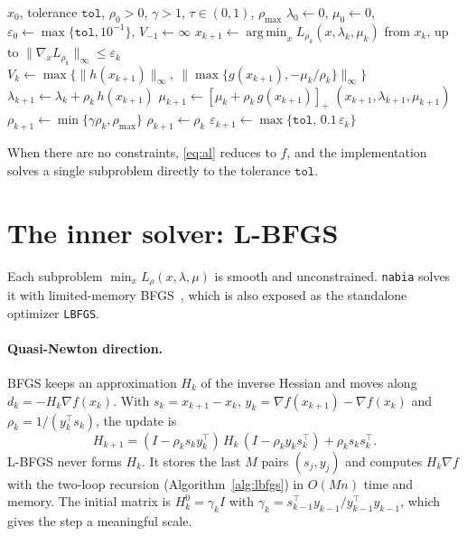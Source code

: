 \documentclass[11pt,a4paper]{article}
\newcommand{\norm}[1]{\lVert #1\rVert}
\newcommand{\pos}[1]{\left[#1\right]_+}
\DeclareMathOperator*{\argmin}{arg\,min}
\begin{document}
\begin{algorithm}[ht]
\caption{Augmented Lagrangian (PHR) with L-BFGS inner solver}\label{alg:al}
\begin{algorithmic}[1]
\Require $x_0$, tolerance $\texttt{tol}$, $\rho_0>0$, $\gamma>1$, $\tau\in(0,1)$, $\rho_{\max}$
\State $\lambda_0\gets 0$, $\mu_0\gets 0$, $\varepsilon_0 \gets \max\{\texttt{tol},10^{-1}\}$, $V_{-1}\gets\infty$
  \State $x_{k+1}\gets\argmin_x L_{\rho_k}(x,\lambda_k,\mu_k)$ from $x_k$, up to $\norm{\nabla_x L_{\rho_k}}_\infty\le\varepsilon_k$ 
  \State $V_k \gets \max\{\norm{h(x_{k+1})}_\infty,\ \norm{\max\{g(x_{k+1}),-\mu_k/\rho_k\}}_\infty\}$
  \State $\lambda_{k+1}\gets\lambda_k+\rho_k\,h(x_{k+1})$
  \State $\mu_{k+1}\gets\pos{\mu_k+\rho_k\,g(x_{k+1})}$
  \If{$\norm{\nabla_x L_{\rho_k}(x_{k+1},\lambda_k,\mu_k)}_\infty\le\texttt{tol}$ \textbf{and} $V_k\le\texttt{tol}$}
    \State \Return $(x_{k+1},\lambda_{k+1},\mu_{k+1})$ 
  \EndIf
    \State $\rho_{k+1}\gets\min\{\gamma\rho_k,\rho_{\max}\}$
  \Else
    \State $\rho_{k+1}\gets\rho_k$
  \EndIf
  \State $\varepsilon_{k+1}\gets\max\{\texttt{tol},\,0.1\,\varepsilon_k\}$
\EndFor
\end{algorithmic}
\end{algorithm}

When there are no constraints, \eqref{eq:al} reduces to $f$, and the
implementation solves a single subproblem directly to the tolerance
$\texttt{tol}$.

\section{The inner solver: L-BFGS}\label{sec:lbfgs}

Each subproblem $\min_x L_{\rho}(x,\lambda,\mu)$ is smooth and unconstrained.
\texttt{nabia} solves it with limited-memory BFGS~\cite{nocedal1980,liu1989},
which is also exposed as the standalone optimizer \texttt{LBFGS}.

\paragraph{Quasi-Newton direction.}
BFGS keeps an approximation $H_k$ of the inverse Hessian and moves along
$d_k=-H_k\nabla f(x_k)$. With $s_k=x_{k+1}-x_k$, $y_k=\nabla f(x_{k+1})-\nabla f(x_k)$
and $\rho_k=1/(y_k^\top s_k)$, the update is
\[
  H_{k+1} = (I-\rho_k s_k y_k^\top)\,H_k\,(I-\rho_k y_k s_k^\top) + \rho_k s_k s_k^\top .
\]
L-BFGS never forms $H_k$. It stores the last $M$ pairs $(s_j,y_j)$ and computes
$H_k\nabla f$ with the two-loop recursion (Algorithm~\ref{alg:lbfgs}) in
$O(Mn)$ time and memory. The initial matrix is
$H_k^0=\gamma_k I$ with $\gamma_k = s_{k-1}^\top y_{k-1}/y_{k-1}^\top y_{k-1}$,
which gives the step a meaningful scale.
\end{document}
